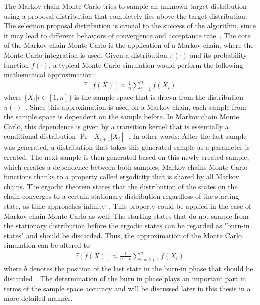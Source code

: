 The Markov chain Monte Carlo tries to sample an unknown target distribution using a proposal distribution that completely lies above the target distribution. The selection proposal distribution is crucial to the success of the algorithm, since it may lead to different behaviors of convergence and acceptance rate~\cite{mcmc_handbook}. The core of the Markov chain Monte Carlo is the application of a Markov chain, where the Monte Carlo integration is used. Given a distribution $\pi(\cdot)$ and its probability function $f(\cdot)$, a typical Monte Carlo simulation would perform the following mathematical approximation:
\begin{align}
\mathbb{E}[f(X)] \approx \frac{1}{n}\sum_{i=1}^{n}f(X_i)
\end{align}
where $\{X_i | i\in[1, n]\}$ is the sample space that is drawn from the distribution $\pi(\cdot)$~\cite{mcmc_practice}. Since this approximation is used on a Markov chain, each sample from the sample space is dependent on the sample before. In Markov chain Monte Carlo, this dependence is given by a transition kernel that is essentially a conditional distribution $\Pr[X_{i+1}|X_i]$~\cite{mcmc_practice}. In other words: After the last sample was generated, a distribution that takes this generated sample as a parameter is created. The next sample is then generated based on this newly created sample, which creates a dependence between both samples. Markov chains Monte Carlo functions thanks to a property called ergodicity that is shared by all Markov chains. The ergodic theorem states that the distribution of the states on the chain converges to a certain stationary distribution regardless of the starting state, as time approaches infinity~\cite{ergodicity}. This property could be applied in the case of Markov chain Monte Carlo as well. The starting states that do not sample from the stationary distribution before the ergodic states can be regarded as "burn-in states" and should be discarded. Thus, the approximation of the Monte Carlo simulation can be altered to
\begin{align}
\mathbb{E}[f(X)] \approx \frac{1}{n-b}\sum_{i=b + 1}^{n}f(X_i)
\end{align}
where $b$ denotes the position of the last state in the burn-in phase that should be discarded~\cite{mcmc_practice}. The determination of the burn in phase plays an important part in terms of the sample space accuracy and will be discussed later in this thesis in a more detailed manner.

